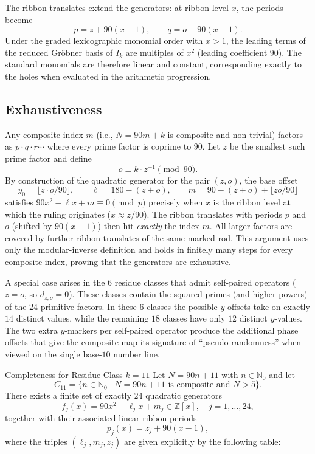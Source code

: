 \documentclass[11pt,a4paper]{article}
\begin{document}
The ribbon translates extend the generators: at ribbon level \(x\), the periods become
\[
p=z+90(x-1),\qquad q=o+90(x-1).
\]
Under the graded lexicographic monomial order with \(x>1\), the leading terms of the reduced Gröbner basis of \(I_k\) are multiples of \(x^2\) (leading coefficient \(90\)). The standard monomials are therefore linear and constant, corresponding exactly to the holes when evaluated in the arithmetic progression.

\subsection{Exhaustiveness}

Any composite index \(m\) (i.e., \(N=90m+k\) is composite and non-trivial) factors as \(p\cdot q\cdot r\cdots\) where every prime factor is coprime to \(90\). Let \(z\) be the smallest such prime factor and define
\[
o\equiv k\cdot z^{-1}\pmod{90}.
\]
By construction of the quadratic generator for the pair \((z,o)\), the base offset
\[
y_0=\lfloor z\cdot o/90\rfloor,\qquad \ell=180-(z+o),\qquad m=90-(z+o)+\lfloor zo/90\rfloor
\]
satisfies \(90x^2-\ell x+m\equiv0\pmod{p}\) precisely when \(x\) is the ribbon level at which the ruling originates (\(x\approx z/90\)). The ribbon translates with periods \(p\) and \(o\) (shifted by \(90(x-1)\)) then hit \emph{exactly} the index \(m\). All larger factors are covered by further ribbon translates of the same marked rod. This argument uses only the modular-inverse definition and holds in finitely many steps for every composite index, proving that the generators are exhaustive.

A special case arises in the \(6\) residue classes that admit self-paired operators (\(z=o\), so \(d_{z,o}=0\)). These classes contain the squared primes (and higher powers) of the \(24\) primitive factors. In these \(6\) classes the possible \(y\)-offsets take on exactly \(14\) distinct values, while the remaining \(18\) classes have only \(12\) distinct \(y\)-values. The two extra \(y\)-markers per self-paired operator produce the additional phase offsets that give the composite map its signature of ``pseudo-randomness'' when viewed on the single base-\(10\) number line.


\begin{lemma}
    Completeness for Residue Class \(k=11\)
Let \(N = 90n + 11\) with \(n \in \mathbb{N}_0\) and let
\[
C_{11} = \{ n \in \mathbb{N}_0 \mid N = 90n + 11 \text{ is composite and } N > 5 \}.
\]
There exists a finite set of exactly \(24\) quadratic generators
\[
f_j(x) = 90x^2 - \ell_j x + m_j \in \mathbb{Z}[x], \quad j=1,\dots,24,
\]
together with their associated linear ribbon periods
\[
p_j(x) = z_j + 90(x-1),
\]
where the triples \((\ell_j, m_j, z_j)\) are given explicitly by the following table:
\end{lemma}
\end{document}
